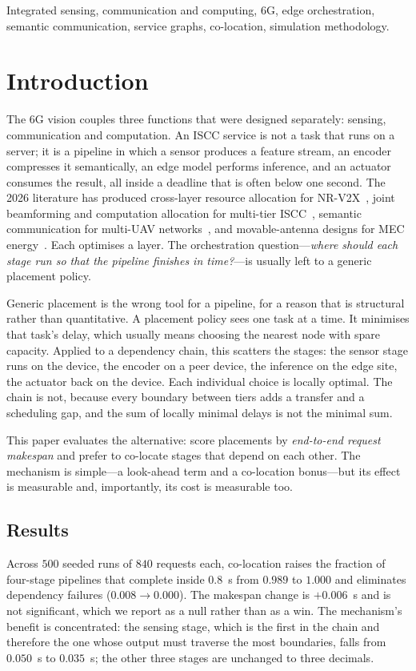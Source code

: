 \documentclass[journal,10pt]{IEEEtran}
\begin{document}
\begin{IEEEkeywords}
Integrated sensing, communication and computing, 6G, edge orchestration,
semantic communication, service graphs, co-location, simulation methodology.
\end{IEEEkeywords}

\section{Introduction}
\label{sec:intro}

The 6G vision couples three functions that were designed separately: sensing,
communication and computation. An ISCC service is not a task that runs on a
server; it is a pipeline in which a sensor produces a feature stream, an
encoder compresses it semantically, an edge model performs inference, and an
actuator consumes the result, all inside a deadline that is often below one
second. The 2026 literature has produced cross-layer resource allocation for
NR-V2X~\cite{indulekha2026iscc}, joint beamforming and computation allocation
for multi-tier ISCC~\cite{liu2026iscc}, semantic communication for multi-UAV
networks~\cite{li2026semantic}, and movable-antenna designs for MEC
energy~\cite{chen2026movable,wang2026movablemec}. Each optimises a layer. The
orchestration question---\emph{where should each stage run so that the pipeline
finishes in time?}---is usually left to a generic placement policy.

Generic placement is the wrong tool for a pipeline, for a reason that is
structural rather than quantitative. A placement policy sees one task at a
time. It minimises that task's delay, which usually means choosing the nearest
node with spare capacity. Applied to a dependency chain, this scatters the
stages: the sensor stage runs on the device, the encoder on a peer device, the
inference on the edge site, the actuator back on the device. Each individual
choice is locally optimal. The chain is not, because every boundary between
tiers adds a transfer and a scheduling gap, and the sum of locally minimal
delays is not the minimal sum.

This paper evaluates the alternative: score placements by \emph{end-to-end
request makespan} and prefer to co-locate stages that depend on each other.
The mechanism is simple---a look-ahead term and a co-location bonus---but its
effect is measurable and, importantly, its cost is measurable too.

\subsection{Results}
Across $500$ seeded runs of $840$ requests each, co-location raises the
fraction of four-stage pipelines that complete inside $0.8$~s from $0.989$ to
$1.000$ and eliminates dependency failures ($0.008\to0.000$). The makespan
change is $+0.006$~s and is not significant, which we report as a null rather
than as a win. The mechanism's benefit is concentrated: the sensing stage, which
is the first in the chain and therefore the one whose output must traverse the
most boundaries, falls from $0.050$~s to $0.035$~s; the other three stages are
unchanged to three decimals.
\end{document}
